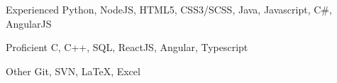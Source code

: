 


\begin{cvskills}


\cvskill
{Experienced} %
{Python, NodeJS, HTML5, CSS3/SCSS, Java, Javascript, C\#, AngularJS} %


\cvskill
{Proficient} %
{C, C++, SQL, ReactJS, Angular, Typescript} %

	
\cvskill
{Other}
{Git, SVN, LaTeX, Excel}


\end{cvskills}